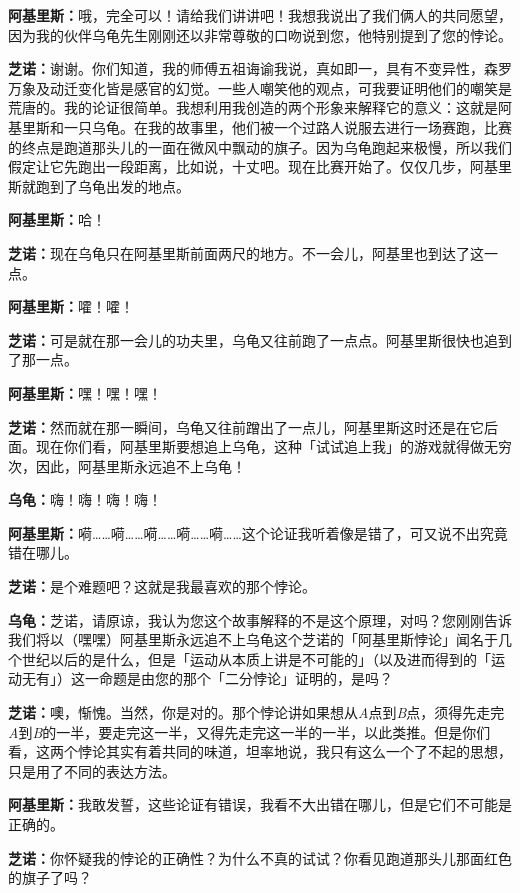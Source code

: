 \documentclass[
  12pt,
  twoside,
  openright,
  oldfontcommands,
]{memoir}
\newcommand{\dialogname}[1]{{\heifamily\bfseries #1}}
\begin{document}
\dialogname{阿基里斯：}哦，完全可以！请给我们讲讲吧！我想我说出了我们俩人的共同愿望，因为我的伙伴乌龟先生刚刚还以非常尊敬的口吻说到您，他特别提到了您的悖论。

\dialogname{芝诺：}谢谢。你们知道，我的师傅五祖诲谕我说，真如即一，具有不变异性，森罗万象及动迁变化皆是感官的幻觉。一些人嘲笑他的观点，可我要证明他们的嘲笑是荒唐的。我的论证很简单。我想利用我创造的两个形象来解释它的意义：这就是阿基里斯和一只乌龟。在我的故事里，他们被一个过路人说服去进行一场赛跑，比赛的终点是跑道那头儿的一面在微风中飘动的旗子。因为乌龟跑起来极慢，所以我们假定让它先跑出一段距离，比如说，十丈吧。现在比赛开始了。仅仅几步，阿基里斯就跑到了乌龟出发的地点。

\dialogname{阿基里斯：}哈！

\dialogname{芝诺：}现在乌龟只在阿基里斯前面两尺的地方。不一会儿，阿基里也到达了这一点。

\dialogname{阿基里斯：}嚯！嚯！

\dialogname{芝诺：}可是就在那一会儿的功夫里，乌龟又往前跑了一点点。阿基里斯很快也追到了那一点。

\dialogname{阿基里斯：}嘿！嘿！嘿！

\dialogname{芝诺：}然而就在那一瞬间，乌龟又往前蹭出了一点儿，阿基里斯这时还是在它后面。现在你们看，阿基里斯要想追上乌龟，这种「试试追上我」的游戏就得做无穷次，因此，阿基里斯永远追不上乌龟！

\dialogname{乌龟：}嗨！嗨！嗨！嗨！

\dialogname{阿基里斯：}嗬\ldots\ldots 嗬\ldots\ldots 嗬\ldots\ldots 嗬\ldots\ldots 嗬\ldots\ldots 这个论证我听着像是错了，可又说不出究竟错在哪儿。

\dialogname{芝诺：}是个难题吧？这就是我最喜欢的那个悖论。

\dialogname{乌龟：}芝诺，请原谅，我认为您这个故事解释的不是这个原理，对吗？您刚刚告诉我们将以（嘿嘿）阿基里斯永远追不上乌龟这个芝诺的「阿基里斯悖论」闻名于几个世纪以后的是什么，但是「运动从本质上讲是不可能的」（以及进而得到的「运动无有」）这一命题是由您的那个「二分悖论」证明的，是吗？

\dialogname{芝诺：}噢，惭愧。当然，你是对的。那个悖论讲如果想从\emph{A}点到\emph{B}点，须得先走完\emph{A}到\emph{B}的一半，要走完这一半，又得先走完这一半的一半，以此类推。但是你们看，这两个悖论其实有着共同的味道，坦率地说，我只有这么一个了不起的思想，只是用了不同的表达方法。

\dialogname{阿基里斯：}我敢发誓，这些论证有错误，我看不大出错在哪儿，但是它们不可能是正确的。

\dialogname{芝诺：}你怀疑我的悖论的正确性？为什么不真的试试？你看见跑道那头儿那面红色的旗子了吗？
\end{document}
